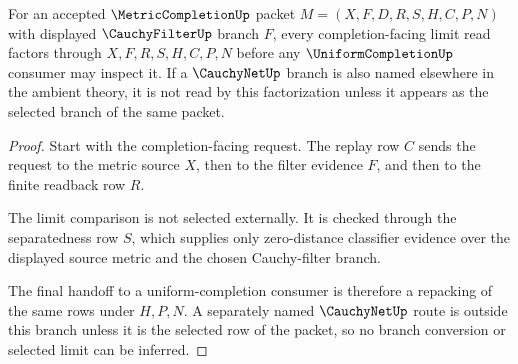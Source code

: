 \begin{theorem}
\label{thm:metriccompletion-cauchyfilter-limit-factorization}
For an accepted $\MetricCompletionUp$ packet $M=(X,F,D,R,S,H,C,P,N)$ with displayed $\CauchyFilterUp$ branch $F$, every completion-facing limit read factors through $X,F,R,S,H,C,P,N$ before any $\UniformCompletionUp$ consumer may inspect it. If a $\CauchyNetUp$ branch is also named elsewhere in the ambient theory, it is not read by this factorization unless it appears as the selected branch of the same packet.
\end{theorem}
\begin{proof}
Start with the completion-facing request. The replay row $C$ sends the request to the metric source $X$, then to the filter evidence $F$, and then to the finite readback row $R$.

The limit comparison is not selected externally. It is checked through the separatedness row $S$, which supplies only zero-distance classifier evidence over the displayed source metric and the chosen Cauchy-filter branch.

The final handoff to a uniform-completion consumer is therefore a repacking of the same rows under $H,P,N$. A separately named $\CauchyNetUp$ route is outside this branch unless it is the selected row of the packet, so no branch conversion or selected limit can be inferred.
\end{proof}

